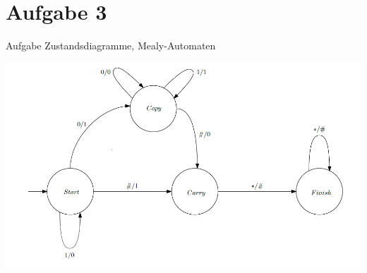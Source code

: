 
\section{Aufgabe 3}

\setcounter{exercise}{1}

%


    \begin{frame}{Aufgabe \thesection}{Zustandsdiagramme, Mealy-Automaten}
        \begin{solutionnoinc}
            \includegraphics[height=0.5\paperheight, center]{./figures/Mealy-Increment.png}
        \end{solutionnoinc}
    \end{frame}

